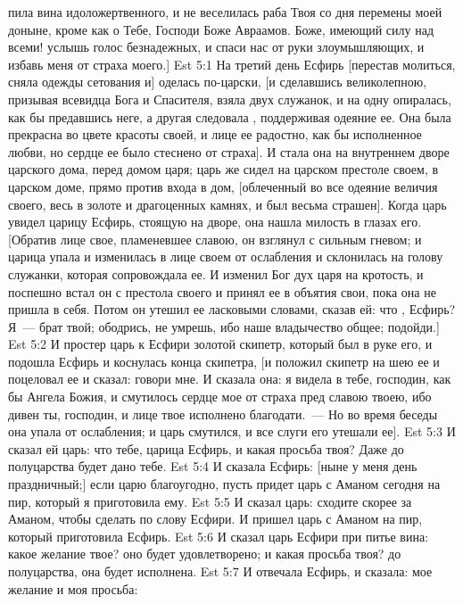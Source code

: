 пила вина идоложертвенного, и не веселилась раба Твоя со дня перемены  моей доныне, кроме как о Тебе, Господи Боже Авраамов. Боже, имеющий силу над всеми! услышь голос безнадежных, и спаси нас от руки злоумышляющих, и избавь меня от страха моего.]
\vs Est 5:1 На третий день Есфирь [перестав молиться, сняла одежды сетования и] оделась по-царски, [и сделавшись великолепною, призывая всевидца Бога и Спасителя, взяла двух служанок, и на одну опиралась, как бы предавшись неге, а другая следовала , поддерживая одеяние ее. Она была прекрасна во цвете красоты своей, и лице ее радостно, как бы исполненное любви, но сердце ее было стеснено от страха]. И стала она на внутреннем дворе царского дома, перед домом царя; царь же сидел  на царском престоле своем, в царском доме, прямо против входа в дом, [облеченный во все одеяние величия своего, весь в золоте и драгоценных камнях, и был весьма страшен]. Когда царь увидел царицу Есфирь, стоящую на дворе, она нашла милость в глазах его. [Обратив лице свое, пламеневшее славою, он взглянул с сильным гневом; и царица упала  и изменилась в лице своем от ослабления и склонилась на голову служанки, которая сопровождала ее. И изменил Бог дух царя на кротость, и поспешно встал он с престола своего и принял ее в объятия свои, пока она не пришла в себя. Потом он утешил ее ласковыми словами, сказав ей: что , Есфирь? Я~--- брат твой; ободрись, не умрешь, ибо наше владычество общее; подойди.]
\vs Est 5:2 И простер царь к Есфири золотой скипетр, который был в руке его, и подошла Есфирь и коснулась конца скипетра, [и положил  скипетр на шею ее и поцеловал ее и сказал: говори мне. И сказала она: я видела в тебе, господин, как бы Ангела Божия, и смутилось сердце мое от страха пред славою твоею, ибо дивен ты, господин, и лице твое исполнено благодати.~--- Но во время беседы она упала от ослабления; и царь смутился, и все слуги его утешали ее].
\vs Est 5:3 И сказал ей царь: что тебе, царица Есфирь, и какая просьба твоя? Даже до полуцарства будет дано тебе.
\vs Est 5:4 И сказала Есфирь: [ныне у меня день праздничный;] если царю благоугодно, пусть придет царь с Аманом сегодня на пир, который я приготовила ему.
\vs Est 5:5 И сказал царь: сходите скорее за Аманом, чтобы сделать по слову Есфири. И пришел царь с Аманом на пир, который приготовила Есфирь.
\vs Est 5:6 И сказал царь Есфири при питье вина: какое желание твое? оно будет удовлетворено; и какая просьба твоя?  до полуцарства, она будет исполнена.
\vs Est 5:7 И отвечала Есфирь, и сказала:  мое желание и моя просьба:
